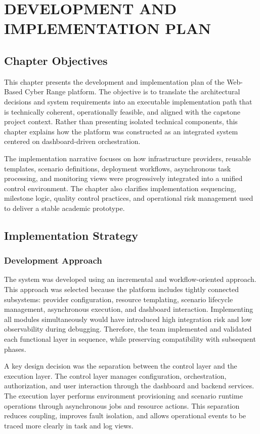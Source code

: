 \chapter{DEVELOPMENT AND IMPLEMENTATION PLAN}

\section{Chapter Objectives}
This chapter presents the development and implementation plan of the Web-Based Cyber Range platform. The objective is to translate the architectural decisions and system requirements into an executable implementation path that is technically coherent, operationally feasible, and aligned with the capstone project context. Rather than presenting isolated technical components, this chapter explains how the platform was constructed as an integrated system centered on dashboard-driven orchestration.

The implementation narrative focuses on how infrastructure providers, reusable templates, scenario definitions, deployment workflows, asynchronous task processing, and monitoring views were progressively integrated into a unified control environment. The chapter also clarifies implementation sequencing, milestone logic, quality control practices, and operational risk management used to deliver a stable academic prototype.

\section{Implementation Strategy}
\subsection{Development Approach}
The system was developed using an incremental and workflow-oriented approach. This approach was selected because the platform includes tightly connected subsystems: provider configuration, resource templating, scenario lifecycle management, asynchronous execution, and dashboard interaction. Implementing all modules simultaneously would have introduced high integration risk and low observability during debugging. Therefore, the team implemented and validated each functional layer in sequence, while preserving compatibility with subsequent phases.

A key design decision was the separation between the control layer and the execution layer. The control layer manages configuration, orchestration, authorization, and user interaction through the dashboard and backend services. The execution layer performs environment provisioning and scenario runtime operations through asynchronous jobs and resource actions. This separation reduces coupling, improves fault isolation, and allows operational events to be traced more clearly in task and log views.


